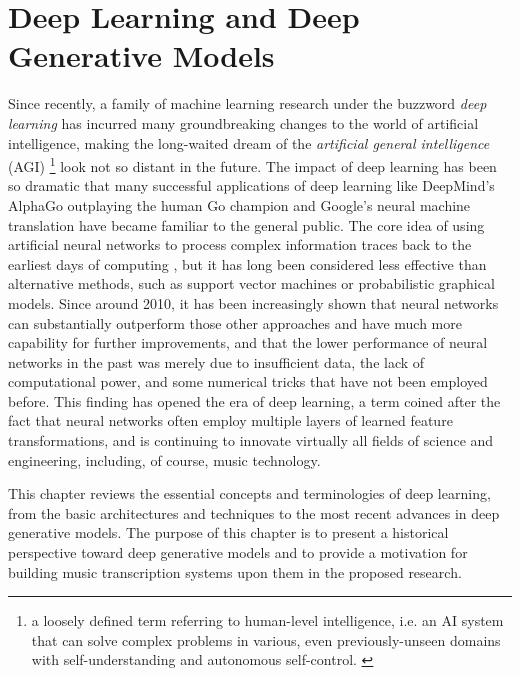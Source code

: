 
\graphicspath{{3-deeplearning/figures/}}

\chapter{Deep Learning and Deep Generative Models}\label{sec:deeplearning}
\label{ch:deeplearning}

Since recently, a family of machine learning research under the buzzword \emph{deep learning} has incurred many groundbreaking changes to the world of artificial intelligence, making the long-waited dream of the \emph{artificial general intelligence} (AGI) \footnote{a loosely defined term referring to human-level intelligence, i.e. an AI system that can solve complex problems in various, even previously-unseen domains with self-understanding and autonomous self-control. \cite{goertzel2007agi}} look not so distant in the future.
The impact of deep learning has been so dramatic that many successful applications of deep learning like DeepMind's AlphaGo outplaying the human Go champion and Google's neural machine translation have became familiar to the general public.
The core idea of using artificial neural networks to process complex information traces back to the earliest days of computing \cite{kleene1951representation}, but it has long been considered less effective than alternative methods, such as support vector machines or probabilistic graphical models.
Since around 2010, it has been increasingly shown that neural networks can substantially outperform those other approaches and have much more capability for further improvements, and that the lower performance of neural networks in the past was merely due to insufficient data, the lack of computational power, and some numerical tricks that have not been employed before.
This finding has opened the era of deep learning, a term coined after the fact that neural networks often employ multiple layers of learned feature transformations, and is continuing to innovate virtually all fields of science and engineering, including, of course, music technology.

This chapter reviews the essential concepts and terminologies of deep learning, from the basic architectures and techniques to the most recent advances in deep generative models.
The purpose of this chapter is to present a historical perspective toward deep generative models and to provide a motivation for building music transcription systems upon them in the proposed research.


